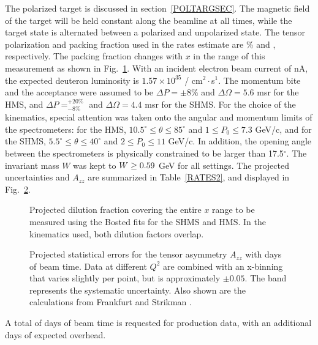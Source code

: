 The polarized \TARGET target is discussed in section~\ref{POLTARGSEC}.  The magnetic field of the target will be held constant along the beamline at all times, while the target state is alternated between a polarized and unpolarized state.
The tensor polarization and packing fraction used in the rates estimate are \PZZ\% and \PF, respectively. 
The packing fraction changes with $x$ in the range of this measurement as shown in Fig.~\ref{fdil_plot}.
With an incident
electron beam current of \CURRENT nA, the
expected deuteron luminosity is $1.57\times 10^{35}$ / cm$^2\cdot$s$^1$. The momentum bite and the acceptance
were assumed to be $\Delta P = \pm 8\%$ and $\Delta\Omega = 5.6$ msr for the HMS, and $\Delta P= ^{+20\%}_{-8\%}$ 
and $\Delta\Omega =4.4$ msr for the SHMS. 
%
For the choice of the kinematics,
special attention was taken onto the angular and momentum limits of the spectrometers: for the
HMS, $10.5^{\circ} \le \theta \le 85^{\circ}$ and $1 \le P_0 \le 7.3$ GeV/c, and for the SHMS,
$5.5^{\circ} \le \theta \le 40^{\circ}$ and $2 \le P_0 \le 11$ GeV/c. In addition, the
opening angle between the spectrometers is physically constrained to be larger than 17.5$^{\circ}$.
The invariant mass $W$ was kept to $W \ge 0.59$ GeV for all settings.
The projected 
uncertainties and $A_{zz}$
are summarized in Table~\ref{RATES2}, and displayed in
Fig.~\ref{PROJ}.  

\begin{figure}
\begin{center}
\caption{\label{fdil_plot}Projected dilution fraction covering the entire $x$ range to be measured using the Bosted fits \cite{Bosted:2012qc} for the SHMS and HMS. In the kinematics used, both dilution factors overlap.}
\end{center}
\end{figure}

\begin{figure}
\begin{center}
\caption{\label{PROJ}Projected statistical errors for the tensor asymmetry $A_{zz}$ with \productiondays days of beam time. Data at different $Q^2$ are combined with an x-binning that varies slightly per point, but is approximately $\pm0.05$. The band represents the systematic uncertainty. Also shown are the calculations from Frankfurt and Strikman \cite{Frankfurt:1988nt}.
}
\end{center}
\end{figure}

A total of 
\productiondays
 days of beam time is requested for production data, with an additional \overheaddays days of expected overhead.



\clearpage

%






